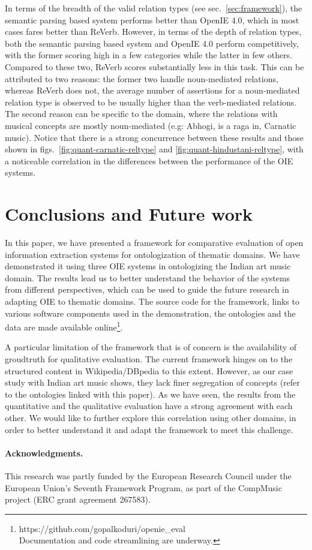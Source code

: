 \documentclass{llncs}
\begin{document}
In terms of the breadth of the valid relation types (see sec.~\ref{sec:framework}), the semantic parsing based system performs better than OpenIE 4.0, which in most cases fares better than ReVerb. However, in terms of the depth of relation types, both the semantic parsing based system and OpenIE 4.0 perform competitively, with the former scoring high in a few categories while the latter in few others. Compared to these two, ReVerb scores substantially less in this task. This can be attributed to two reasons: the former two handle noun-mediated relations, whereas ReVerb does not, the average number of assertions for a noun-mediated relation type is observed to be usually higher than the verb-mediated relations. The second reason can be specific to the domain, where the relations with musical concepts are mostly noun-mediated (e.g: Abhogi, is a raga in, Carnatic music). Notice that there is a strong concurrence between these results and those shown in figs.~\ref{fig:quant-carnatic-reltype} and \ref{fig:quant-hindustani-reltype}, with a noticeable correlation in the differences between the performance of the OIE systems.

\section{Conclusions and Future work}
\label{sec:conclusions}
In this paper, we have presented a framework for comparative evaluation of open information extraction systems for ontologization of thematic domains. We have demonstrated it using three OIE systems in ontologizing the Indian art music domain. The results lead us to better understand the behavior of the systems from different perspectives, which can be used to guide the future research in adapting OIE to thematic domains. The source code for the framework, links to various software components used in the demonstration, the ontologies and the data are made available online\footnote{https://github.com/gopalkoduri/openie\_eval\\Documentation and code streamlining are underway.}. 

A particular limitation of the framework that is of concern is the availability of groudtruth for qualitative evaluation. The current framework hinges on to the structured content in Wikipedia/DBpedia to this extent. However, as our case study with Indian art music shows, they lack finer segregation of concepts (refer to the ontologies linked with this paper). As we have seen, the results from the quantitative and the qualitative evaluation have a strong agreement with each other. We would like to further explore this correlation using other domains, in order to better understand it and adapt the framework to meet this challenge.

\paragraph{\textbf{Acknowledgments.}} This research was partly funded by the European Research Council under the European Union's Seventh Framework Program, as part of the CompMusic project (ERC grant agreement 267583).

\renewcommand\bibname{References}
{\fontsize{9}{10}\selectfont
\footnotesize


}
\end{document}
